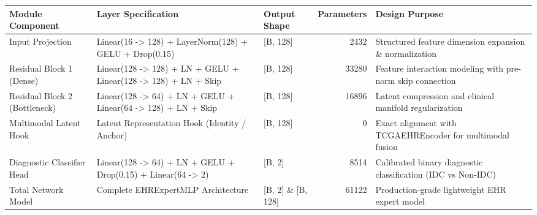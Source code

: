 \begin{tabular}{lllrl}
\toprule
Module Component & Layer Specification & Output Shape & Parameters & Design Purpose \\
\midrule
Input Projection & Linear(16 -> 128) + LayerNorm(128) + GELU + Drop(0.15) & [B, 128] & 2432 & Structured feature dimension expansion \& normalization \\
Residual Block 1 (Dense) & Linear(128 -> 128) + LN + GELU + Linear(128 -> 128) + LN + Skip & [B, 128] & 33280 & Feature interaction modeling with pre-norm skip connection \\
Residual Block 2 (Bottleneck) & Linear(128 -> 64) + LN + GELU + Linear(64 -> 128) + LN + Skip & [B, 128] & 16896 & Latent compression and clinical manifold regularization \\
Multimodal Latent Hook & Latent Representation Hook (Identity / Anchor) & [B, 128] & 0 & Exact alignment with TCGAEHREncoder for multimodal fusion \\
Diagnostic Classifier Head & Linear(128 -> 64) + LN + GELU + Drop(0.15) + Linear(64 -> 2) & [B, 2] & 8514 & Calibrated binary diagnostic classification (IDC vs Non-IDC) \\
Total Network Model & Complete EHRExpertMLP Architecture & [B, 2] \& [B, 128] & 61122 & Production-grade lightweight EHR expert model \\
\bottomrule
\end{tabular}
